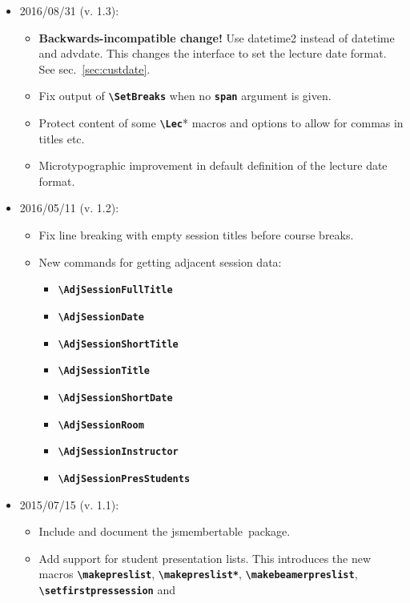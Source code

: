 \documentclass[english]{article}
\newcommand*\jmacro[1]{\textbf{\texttt{#1}}}
\newcommand*\jcsmacro[1]{\jmacro{\textbackslash{#1}}}
\newcommand*\joption[1]{\textbf{\texttt{#1}}}
\newcommand*\jsmt{\textsf{jsmembertable}}
\begin{document}
\begin{itemize}
\begin{itemize}
	\end{itemize}
\item 2016/08/31 (v. 1.3):
     \begin{itemize}
     	\item \textbf{Backwards-incompatible change!} Use \textsf{datetime2} instead of \textsf{datetime} and \textsf{advdate}.
     	      This changes the interface to set the lecture date format. See sec.~\ref{sec:custdate}.
     	\item Fix output of \jcsmacro{SetBreaks} when no \joption{span} argument is given.
     	\item Protect content of some \jcsmacro{Lec}* macros and options to allow for commas in
     	      titles etc.
        \item Microtypographic improvement in default definition of the lecture date format.
	 \end{itemize}
\item 2016/05/11 (v. 1.2):
    \begin{itemize}	
	\item Fix line breaking with empty session titles before course breaks. 
	\item New commands for getting adjacent session data:
	   \begin{itemize}	
		  \item \jcsmacro{AdjSessionFullTitle}
		  \item \jcsmacro{AdjSessionDate}
		  \item \jcsmacro{AdjSessionShortTitle}
		  \item \jcsmacro{AdjSessionTitle}
		  \item \jcsmacro{AdjSessionShortDate}
		  \item \jcsmacro{AdjSessionRoom}
		  \item \jcsmacro{AdjSessionInstructor}\enlargethispage{\baselineskip}
		  \item \jcsmacro{AdjSessionPresStudents}
	  \end{itemize}
    \end{itemize}
\item 2015/07/15 (v. 1.1):
     \begin{itemize}
       \item Include and document the \jsmt\ package.
       \item Add support for student presentation lists. This introduces the new macros
             \jcsmacro{makepreslist}, \jcsmacro{makepreslist*},
             \jcsmacro{makebeamerpreslist}, \jcsmacro{setfirstpressession} and

\end{itemize}
\end{itemize}
\end{document}
